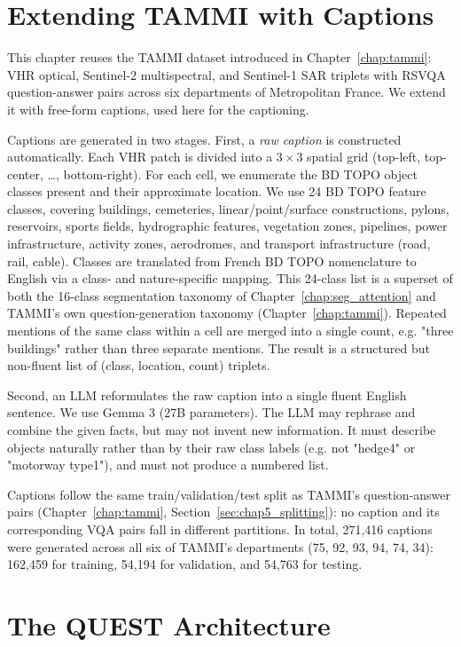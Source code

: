 \section{Extending TAMMI with Captions}
\label{sec:chap6_dataset}

This chapter reuses the TAMMI dataset introduced in
Chapter~\ref{chap:tammi}: VHR optical, Sentinel-2 multispectral, and
Sentinel-1 SAR triplets with RSVQA question-answer pairs across six
departments of Metropolitan France. We extend it with free-form
captions, used here for the captioning.

Captions are generated in two stages. First, a \textit{raw caption} is
constructed automatically. Each VHR patch is divided into a
$3\times3$ spatial grid (top-left, top-center, \ldots, bottom-right).
For each cell, we enumerate the BD TOPO object classes present and
their approximate location. We use 24 BD TOPO feature classes,
covering buildings, cemeteries, linear/point/surface constructions,
pylons, reservoirs, sports fields, hydrographic features, vegetation
zones, pipelines, power infrastructure, activity zones, aerodromes,
and transport infrastructure (road, rail, cable). Classes are
translated from French BD TOPO nomenclature to English via a
class- and nature-specific mapping. This 24-class list is a superset
of both the 16-class segmentation taxonomy of
Chapter~\ref{chap:seg_attention} and TAMMI's own question-generation
taxonomy (Chapter~\ref{chap:tammi}). Repeated mentions of the same
class within a cell are merged into a single count, e.g. "three
buildings" rather than three separate mentions. The result is a
structured but non-fluent list of (class, location, count) triplets.

Second, an LLM reformulates the raw caption into a single fluent
English sentence. We use Gemma 3 (27B parameters). The LLM may rephrase and combine the given facts, but may not
invent new information. It must describe objects naturally rather
than by their raw class labels (e.g. not "hedge4" or "motorway
type1"), and must not produce a numbered list. 

Captions follow the same train/validation/test split as TAMMI's
question-answer pairs (Chapter~\ref{chap:tammi},
Section~\ref{sec:chap5_splitting}): no caption and its corresponding
VQA pairs fall in different partitions. In total, 271,416 captions
were generated across all six of TAMMI's departments (75, 92, 93, 94,
74, 34): 162,459 for training, 54,194 for validation, and 54,763 for
testing.

\section{The QUEST Architecture}
\label{sec:chap6_method}


